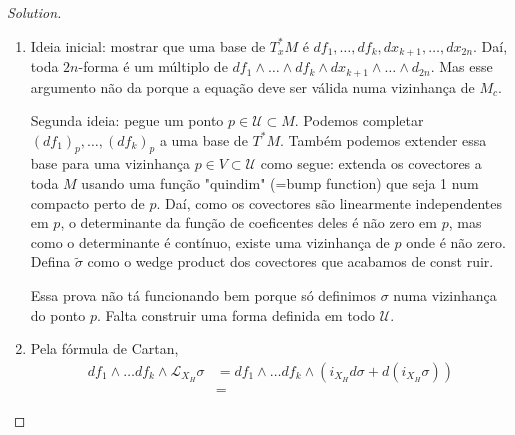 \begin{proof}[Solution]\leavevmode
	\begin{enumerate}[label=\alph*.]
		\item Ideia inicial: mostrar que uma base de $T_x^*M$ \'e $df_1,\ldots,df_k,dx_{k+1},\ldots,dx_{2n}$. Da\'i, toda $2n$-forma \'e um m\'ultiplo de $df_1\wedge \ldots \wedge df_k\wedge dx_{k+1}\wedge \ldots\wedge d_{2n}$. Mas esse argumento n\~ao da porque a equa\c c\~ao deve ser v\'alida numa vizinhança de $M_c$.
			
		Segunda ideia: pegue um ponto $p\in\mathcal{U}\subset M$. Podemos completar $(df_1)_p,\ldots,(df_k)_p$ a uma base de $T^*M$. Tamb\'em podemos extender essa base para uma vizinhança $p\in V\subset \mathcal{U}$ como segue: extenda os covectores a toda $M$ usando uma fun\c c\~ao "quindim" (=bump function) que seja 1 num compacto perto de $p$. Da\'i, como os covectores s\~ao linearmente independentes em $p$, o determinante da fun\c c\~ao de coeficentes deles \'e n\~ao zero em $p$, mas como o determinante \'e cont\'inuo, existe uma vizinhança de $p$ onde \'e n\~ao zero. Defina $\tilde{\sigma}$ como o wedge product dos covectores que acabamos de const ruir.

		Essa prova n\~ao t\'a funcionando bem porque s\'o definimos $\sigma$ numa  vizinhança do ponto $p$. Falta construir uma forma definida em todo $\mathcal{U}$. 

		\item Pela f\'ormula de Cartan,
			\begin{align*}
				df_1\wedge \ldots df_k\wedge \mathcal{L}_{X_H}\sigma&=df_1\wedge \ldots df_k\wedge \left(i_{X_H}d\sigma+d(i_{X_H}\sigma)\right)\\
				&=
			\end{align*}
		
	\end{enumerate}
\end{proof}

